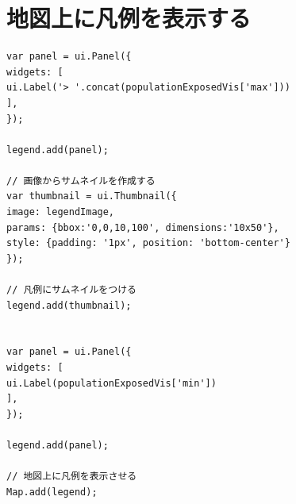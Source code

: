 \documentclass[
]{book}
\begin{document}
\hypertarget{ux5730ux56f3ux4e0aux306bux51e1ux4f8bux3092ux8868ux793aux3059ux308b}{%
\section{地図上に凡例を表示する}\label{ux5730ux56f3ux4e0aux306bux51e1ux4f8bux3092ux8868ux793aux3059ux308b}}

\begin{verbatim}
var panel = ui.Panel({
widgets: [
ui.Label('> '.concat(populationExposedVis['max']))
],
});
 
legend.add(panel);
 
// 画像からサムネイルを作成する
var thumbnail = ui.Thumbnail({
image: legendImage,
params: {bbox:'0,0,10,100', dimensions:'10x50'},
style: {padding: '1px', position: 'bottom-center'}
});
 
// 凡例にサムネイルをつける
legend.add(thumbnail);
 

var panel = ui.Panel({
widgets: [
ui.Label(populationExposedVis['min'])
],
});
 
legend.add(panel);
 
// 地図上に凡例を表示させる
Map.add(legend);
\end{verbatim}

  
\end{document}
